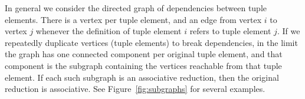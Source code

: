 In general we consider the directed graph of dependencies between tuple elements. There is a vertex per tuple element, and an edge from vertex $i$ to vertex $j$ whenever the definition of tuple element $i$ refers to tuple element $j$. If we repeatedly duplicate vertices (tuple elements) to break dependencies, in the limit the graph has one connected component per original tuple element, and that component is the subgraph containing the vertices reachable from that tuple element. If each such subgraph is an associative reduction, then the original reduction is associative. See Figure~\ref{fig:subgraphs} for several examples.




